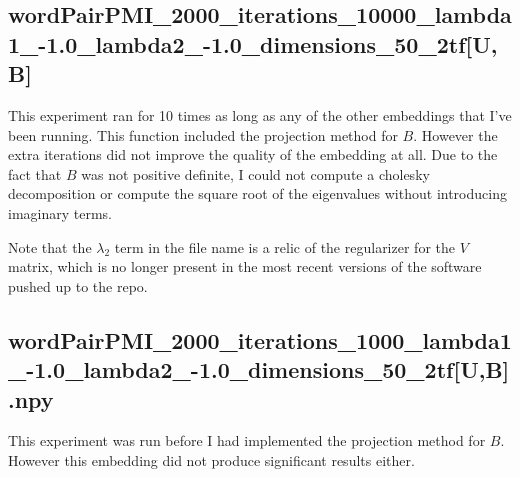 \documentclass{report}
\begin{document}
	\subsection{wordPairPMI\_2000\_iterations\_10000\_lambda1\_-1.0\_lambda2\_-1.0\_dimensions\_50\_2tf[U,B]}
	  This experiment ran for 10 times as long as any of the other embeddings that I've been running. This function included the projection method for $ B $. However the extra iterations did not improve the quality of the embedding at all. Due to the fact that $ B $ was not positive definite, I could not compute a cholesky decomposition or compute the square root of the eigenvalues without introducing imaginary terms. 
	  
	   Note that the $ \lambda_2 $ term in the file name is a relic of the regularizer for the $ V $ matrix, which is no longer present in the most recent versions of the software pushed up to the repo. 
	   
	\subsection{wordPairPMI\_2000\_iterations\_1000\_lambda1\_-1.0\_lambda2\_-1.0\_dimensions\_50\_2tf[U,B].npy}
	  This experiment was run before I had implemented the projection method for $ B $. However this embedding did not produce significant results either. 
	 
	 
\end{document}
